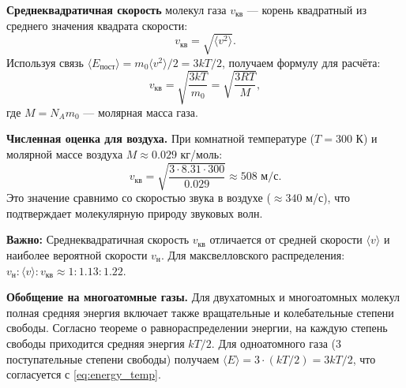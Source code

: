 \begin{definition}
\textbf{Среднеквадратичная скорость} молекул газа $v_{\text{кв}}$ --- корень квадратный из среднего значения квадрата скорости:
\begin{equation}
    v_{\text{кв}} = \sqrt{\langle v^2 \rangle}.
\end{equation}
Используя связь $\langle E_{\text{пост}} \rangle = m_0 \langle v^2 \rangle / 2 = 3kT/2$, получаем формулу для расчёта:
\begin{equation}
    v_{\text{кв}} = \sqrt{\frac{3kT}{m_0}} = \sqrt{\frac{3RT}{M}}, \label{eq:v_rms}
\end{equation}
где $M = N_A m_0$ --- молярная масса газа.
\end{definition}

\begin{remark}
\textbf{Численная оценка для воздуха.} При комнатной температуре ($T = 300$ К) и молярной массе воздуха $M \approx 0.029$ кг/моль:
\begin{equation}
    v_{\text{кв}} = \sqrt{\frac{3 \cdot 8.31 \cdot 300}{0.029}} \approx 508 \text{ м/с}.
\end{equation}
Это значение сравнимо со скоростью звука в воздухе ($\approx 340$ м/с), что подтверждает молекулярную природу звуковых волн.
\par\noindent\textbf{Важно:} Среднеквадратичная скорость $v_{\text{кв}}$ отличается от средней скорости $\langle v \rangle$ и наиболее вероятной скорости $v_{\text{н}}$. Для максвелловского распределения: $v_{\text{н}} : \langle v \rangle : v_{\text{кв}} \approx 1 : 1.13 : 1.22$.
\end{remark}

\begin{remark}
\textbf{Обобщение на многоатомные газы.} Для двухатомных и многоатомных молекул полная средняя энергия включает также вращательные и колебательные степени свободы. Согласно теореме о равнораспределении энергии, на каждую степень свободы приходится средняя энергия $kT/2$. Для одноатомного газа (3 поступательные степени свободы) получаем $\langle E \rangle = 3 \cdot (kT/2) = 3kT/2$, что согласуется с \eqref{eq:energy_temp}.
\end{remark}
